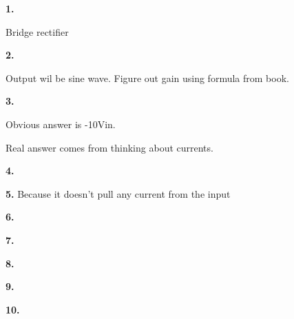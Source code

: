 \documentclass{article}
\begin{document}
\pagecolor{black}
\color{white}

\medskip\noindent\textbf{1.} 

    Bridge rectifier

\medskip\noindent\textbf{2.} 

    Output wil be sine wave. Figure out gain using formula from book.

\medskip\noindent\textbf{3.}

    Obvious answer is -10Vin.

    Real answer comes from thinking about currents.

\newpage\noindent\textbf{4.}

\medskip\noindent\textbf{5.} Because it doesn't pull any current from the input 

\medskip\noindent\textbf{6.}

\newpage\noindent\textbf{7.} 
    
\medskip\noindent\textbf{8.}

\newpage\noindent\textbf{9.}

\medskip\noindent\textbf{10.}
\end{document}
